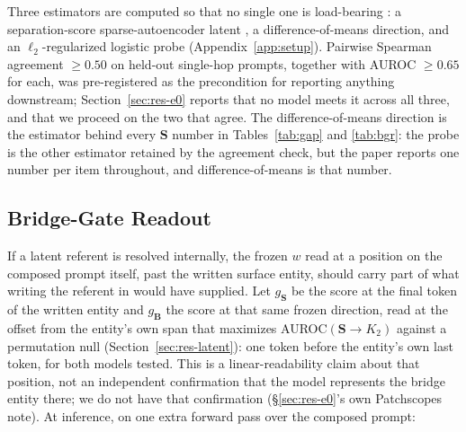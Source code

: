 \documentclass{article}
\newif\ifredflags
\newcommand{\rv}[1]{\ifredflags{\textcolor{red}{\textbf{[VERIFY: #1]}}}\fi}
\newcommand{\gate}{\mathbf{S}}
\newcommand{\bridge}{\mathbf{B}}
\begin{document}
Three estimators are computed so that no single one is load-bearing
\citep{kissane2024saedataset}: a separation-score sparse-autoencoder latent
\citep{lieberum2024gemmascope,he2024llamascope}, a difference-of-means direction, and an
$\ell_2$-regularized logistic probe (Appendix~\ref{app:setup}). Pairwise Spearman agreement
$\ge0.50$ on held-out single-hop prompts, together with AUROC $\ge0.65$ for each, was pre-registered
as the precondition for reporting anything downstream; Section~\ref{sec:res-e0} reports that no model
meets it across all three, and that we proceed on the two that agree. The difference-of-means direction
is the estimator behind every $\gate$ number in Tables~\ref{tab:gap} and \ref{tab:bgr}: the probe is the
other estimator retained by the agreement check, but the paper reports one number per item throughout,
and difference-of-means is that number.

\subsection{Bridge-Gate Readout}
\label{sec:bgr}

\rv{A real bug was found and fixed in how $g_{\bridge}$ was captured for this section (and, before this
fix, for every downstream use of it in this paper). The original capture path
(\texttt{skc\_harness.capture\_for\_queries()}'s own \texttt{acts\_hop2} return value) reads an ISOLATED
single-hop prompt that NAMES THE GOLD BRIDGE (``The \{$r_2$\} of the \{btype\} \{gold bridge\} is''),
not a latent position inside the composed prompt -- confirmed directly (AUROC($g_{\bridge}\!\to\!K_2$)
was $0.853$ on Llama 3.1 70B under that path, the signature of a named-bridge read, not a latent one)
before anything below was recomputed. The numbers in this section, and in
Tables~\ref{tab:bgr}/\ref{tab:bgr-full}, now come from \texttt{skc\_run\_e3.py}'s own composed-prompt
offset capture (anchored to the surface entity's own span, never naming the bridge), which already
existed in this codebase for a different purpose (the offset-sweep figure) and was reused here rather
than built from scratch. \textbf{This is currently a SINGLE-SEED result} (seed 0 only) -- the
multi-seed stability claimed for the earlier, contaminated version has not yet been re-established
under the corrected read, and this section's language has been revised to not claim it.}

If a latent referent is resolved internally, the frozen $w$ read at a position on the composed prompt
itself, past the written surface entity, should carry part of what writing the referent in would have
supplied. Let $g_{\gate}$ be the score at the final token of the written entity and $g_{\bridge}$ the
score at that same frozen direction, read at the offset from the entity's own span that maximizes
AUROC$(\gate\!\to\!K_2)$ against a permutation null (Section~\ref{sec:res-latent}): one token before the
entity's own last token, for both models tested. This is a linear-readability claim about that
position, not an independent confirmation that the model represents the bridge entity there; we do not
have that confirmation (\S\ref{sec:res-e0}'s own Patchscopes note). At inference, on one extra forward
pass over the composed prompt:
\end{document}
